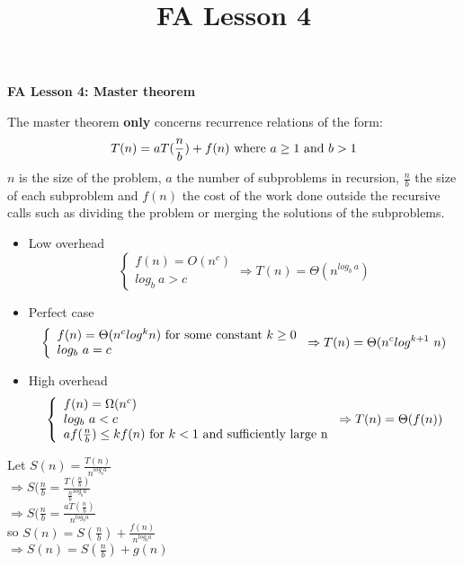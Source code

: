 \documentclass[11pt]{article}
\title{FA Lesson 4}
\begin{document}
\begin{center}
\textbf{FA Lesson 4: Master theorem}
\end{center}
The master theorem \textbf{only} concerns recurrence relations of the form:
\begin{equation}T(n)=aT(\frac{n}{b}) + f(n) \textnormal{ where } a \geq 1 \textnormal{ and } b > 1\end{equation}
\newline $n$ is the size of the problem, $a$ the number of subproblems in recursion, 
$\frac{n}{b}$ the size of each subproblem and $f(n)$ the cost of the work done outside the recursive calls
such as dividing the problem or merging the solutions of the subproblems.

\begin{itemize}
    \item Low overhead
    \begin{equation}
    \left\{
        \begin{array}{ll}
            f(n)=O(n^c) \\
            log_b\ a > c
        \end{array}
    \right. \Rightarrow T(n) = \Theta(n^{log_b\ a})
    \end{equation}
    \item Perfect case
    \begin{equation}
    \left\{
        \begin{array}{ll}
            f(n)=\Theta(n^{c}log^{k}n) \textnormal{ for some constant } k \geq 0 \\
            log_b\ a = c
        \end{array}
    \right. \Rightarrow T(n) = \Theta(n^{c}log^{k+1}\ n)
    \end{equation}
    \item High overhead
    \begin{equation}
    \left\{
        \begin{array}{ll}
            f(n)=\Omega(n^c) \\
            log_b\ a < c \\
            af(\frac{n}{b}) \leq kf(n) \textnormal{ for } k < 1 \textnormal{ and sufficiently large n}
        \end{array}
    \right. \Rightarrow T(n) = \Theta(f(n))
    \end{equation}
\end{itemize}
Let $S(n) = \frac{T(n)}{n^{log_{b}a}}$
\\ $\Rightarrow S(\frac{n}{b} = \frac{T(\frac{n}{b})}{\frac{n}{b}^{log_{b}a}}$
\\ $\Rightarrow S(\frac{n}{b} = \frac{aT(\frac{n}{b})}{n^{log_{b}a}}$
\\ so $S(n) = S(\frac{n}{b}) + \frac{f(n)}{n^{log_{b}a}}$
\\ $\Rightarrow S(n) = S(\frac{n}{b}) + g(n)$
\end{document}
